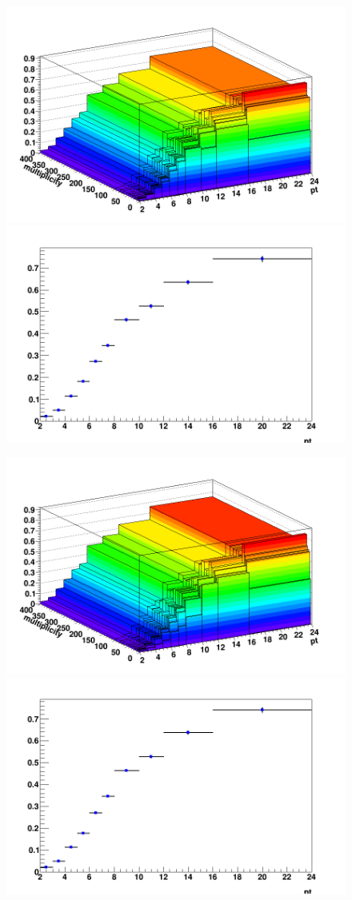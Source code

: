 \begin{figure}[h]   %
	\centering
	
	\includegraphics[width=.48\linewidth]{figuresVsCent/Dstar/EffAndFeed/EfficiencyMap_2D_DStar_c_020_ZNA_wLimAcc_Plot.png
}
	\includegraphics[width=.48\linewidth]{figuresVsCent/Dstar/EffAndFeed/EfficiencyMap_1D_DStar_c_020_ZNA_wLimAcc_Plot.png
}

	\includegraphics[width=.48\linewidth]{figuresVsCent/Dstar/EffAndFeed/EfficiencyMap_2D_DStar_c_2060_ZNA_wLimAcc_Plot.png
}
	\includegraphics[width=.48\linewidth]{figuresVsCent/Dstar/EffAndFeed/EfficiencyMap_1D_DStar_c_2060_ZNA_wLimAcc_Plot.png
}


\end{figure}
